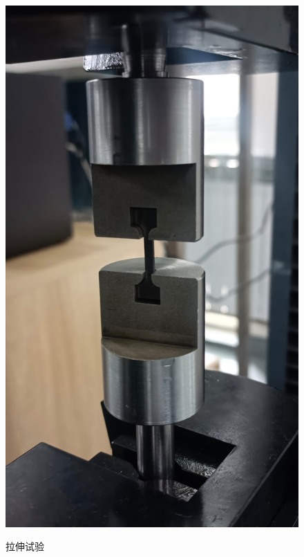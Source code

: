 \begin{figure}[h!]
{		\includegraphics[scale=0.32]{pic/拉伸试验}}
	\caption{拉伸试验}
	\label{fig:拉伸试验}
\end{figure}



